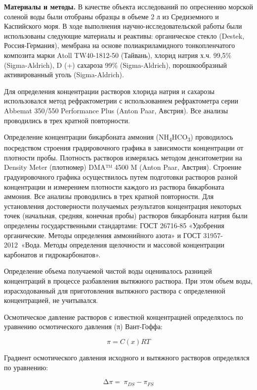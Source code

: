 \begin{multicols}{2}
{\bfseries Материалы и методы.} В качестве объекта исследований по
опреснению морской соленой воды были отобраны образцы в объеме 2 л из
Средиземного и Каспийского моря. В ходе выполнения
научно-исследовательской работы были использованы следующие материалы и
реактивы: органическое стекло (Destek, Россия-Германия), мембрана на
основе полиакриламидного тонкопленчатого композита марки Atoll
TW40-1812-50 (Тайвань), хлорид натрия х.ч. 99,5\% (Sigma-Aldrich), D (+)
сахароза 99\% (Sigma-Aldrich), порошкообразный активированный уголь
(Sigma-Aldrich).

Для определения концентрации растворов хлорида натрия и сахарозы
использовался метод рефрактометрии с использованием рефрактометра серии
Abbemat 350/550 Performance Plus (Anton Paar, Австрия). Все анализы
проводились в трех кратной повторности.

Определение концентрации бикарбоната аммония
(NH\textsubscript{4}HCO\textsubscript{3}) проводилось посредством
строения градировочного графика в зависимости концентрации от плотности
пробы. Плотность растворов измерялась методом денситометрии на Density
Meter (плотномер) DMA™ 4500 M (Anton Paar, Австрия). Строение
градуировочного графика осуществилось путем подготовки растворов разной
концентрации и измерением плотности каждого из раствора бикарбоната
аммония. Все анализы проводились в трех кратной повторности. Для
установления достоверности получаемых результатов концентрация некоторых
точек (начальная, средняя, конечная пробы) растворов бикарбоната натрия
были определены государственными стандартами: ГОСТ 26716-85 «Удобрения
органические. Методы определения аммонийного азота» и ГОСТ
31957-2012~«Вода. Методы определения щелочности и массовой концентрации
карбонатов и гидрокарбонатов».

Определение объема получаемой чистой воды оценивалось разницей
концентраций в процессе разбавления вытяжного раствора. При этом объем
воды, израсходованный для приготовления вытяжного раствора с
определенной концентрацией, не учитывался.

Осмотическое давление растворов с известной концентрацией определялось
по уравнению осмотического давления (π) Вант-Гоффа:

\begin{equation}
\pi = C(x)RT
\end{equation}

Градиент осмотического давления исходного и вытяжного растворов
определялся по уравнению:

\begin{equation}
\mathrm{\Delta}\pi = \ \pi_{DS} - \pi_{FS}
\end{equation}


\end{multicols}
